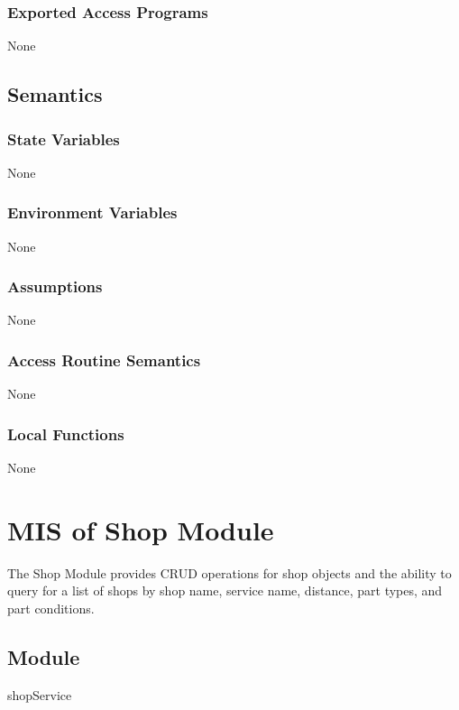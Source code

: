 \documentclass[12pt, titlepage]{article}
\begin{document}
\subsubsection{Exported Access Programs}

None
\subsection{Semantics}

\subsubsection{State Variables}

None

\subsubsection{Environment Variables}

None

\subsubsection{Assumptions}

None

\subsubsection{Access Routine Semantics}

None

\subsubsection{Local Functions}

None

\newpage
\section{MIS of Shop Module} \label{mShop}

The Shop Module provides CRUD operations for shop objects and the ability to query for a list of
shops by shop name, service name, distance, part types, and part conditions.

\subsection{Module}

shopService
\end{document}
